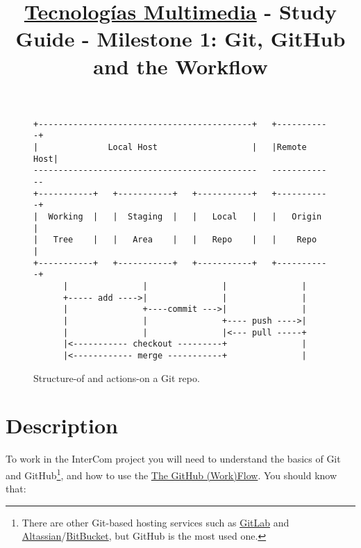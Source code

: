 \title{\href{https://www.ual.es/estudios/grados/presentacion/plandeestudios/asignatura/4015/40154321?idioma=zh_CN}{Tecnologías Multimedia} - Study Guide - Milestone 1: Git, GitHub and the Workflow}

\maketitle

\begin{figure}
\begin{verbatim}
+-------------------------------------------+   +-----------+
|              Local Host                   |   |Remote Host|
---------------------------------------------   -------------
+-----------+   +-----------+   +-----------+   +-----------+
|  Working  |   |  Staging  |   |   Local   |   |   Origin  |
|   Tree    |   |   Area    |   |   Repo    |   |    Repo   |
+-----------+   +-----------+   +-----------+   +-----------+
      |               |               |               |
      +----- add ---->|               |               |
      |               +----commit --->|               |
      |               |               +---- push ---->|
      |               |               |<--- pull -----+
      |<----------- checkout ---------+               |
      |<------------ merge -----------+               |
\end{verbatim}
\caption{Structure-of and actions-on a Git repo.}
\label{fig:local_repo_structure_and_actions}
\end{figure}

\section{Description}

To work in the InterCom project \cite{intercom} you will need to
understand the basics of Git and GitHub\footnote{There are other
Git-based hosting services such as
\href{https://about.gitlab.com/}{GitLab} and
\href{https://www.atlassian.com/git}{Altassian}/\href{https://bitbucket.org/product}{BitBucket},
but GitHub is the most used one.}, and how to use the
\href{https://guides.github.com/introduction/flow/index.html}{The
  GitHub (Work)Flow}. You should know that:

